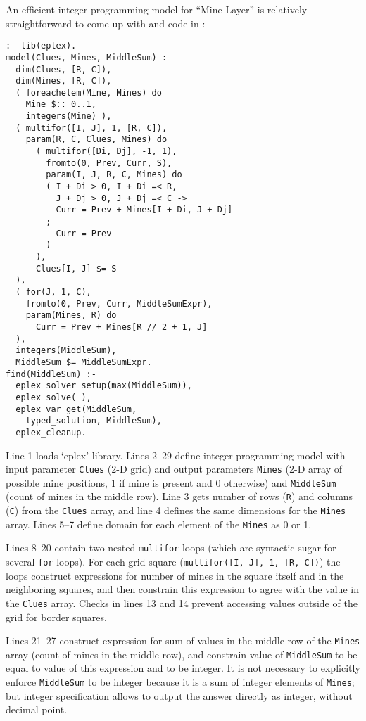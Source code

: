 \documentclass{acm_proc_article-sp}
\begin{document}
An efficient integer programming model for ``Mine Layer'' is relatively straightforward to come up with and code in \eclipse:

\begin{lstlisting}[caption={Integer programming solution for ``Mine Layer''}]
:- lib(eplex).
model(Clues, Mines, MiddleSum) :-
  dim(Clues, [R, C]),
  dim(Mines, [R, C]),
  ( foreachelem(Mine, Mines) do
    Mine $:: 0..1,
    integers(Mine) ),
  ( multifor([I, J], 1, [R, C]), 
    param(R, C, Clues, Mines) do
      ( multifor([Di, Dj], -1, 1), 
        fromto(0, Prev, Curr, S), 
        param(I, J, R, C, Mines) do
        ( I + Di > 0, I + Di =< R, 
          J + Dj > 0, J + Dj =< C ->
          Curr = Prev + Mines[I + Di, J + Dj]
        ;
          Curr = Prev
        )
      ),
      Clues[I, J] $= S 
  ),
  ( for(J, 1, C), 
    fromto(0, Prev, Curr, MiddleSumExpr), 
    param(Mines, R) do
      Curr = Prev + Mines[R // 2 + 1, J] 
  ),
  integers(MiddleSum),
  MiddleSum $= MiddleSumExpr.
find(MiddleSum) :-
  eplex_solver_setup(max(MiddleSum)),
  eplex_solve(_),
  eplex_var_get(MiddleSum, 
    typed_solution, MiddleSum),
  eplex_cleanup.
\end{lstlisting}

Line 1 loads `eplex' library. Lines 2--29 define integer programming model with input parameter \texttt{Clues} (2-D grid)
and output parameters \texttt{Mines} (2-D array of possible mine positions, 1 if mine is present and 0 otherwise) and \texttt{MiddleSum} (count of mines in the middle row).
Line 3 gets number of rows (\texttt{R}) and columns (\texttt{C}) from the \texttt{Clues} array, and line 4 defines the same dimensions for the \texttt{Mines} array.
Lines 5--7 define domain for each element of the \texttt{Mines} as 0 or 1.

Lines 8--20 contain two nested \texttt{multifor} loops (which are syntactic sugar for several \texttt{for} loops).
For each grid square (\texttt{multifor([I, J], 1, [R, C])}) the loops construct expressions for number of mines in the square itself and in the neighboring squares,
and then constrain this expression to agree with the value in the \texttt{Clues} array.
Checks in lines 13 and 14 prevent accessing values outside of the grid for border squares.

Lines 21--27 construct expression for sum of values in the middle row of the \texttt{Mines} array (count of mines in the middle row), 
and constrain value of \texttt{MiddleSum} to be equal to value of this expression and to be integer.
It is not necessary to explicitly enforce \texttt{MiddleSum} to be integer because it is a sum of integer elements of \texttt{Mines};
but integer specification allows to output the answer directly as integer, without decimal point.
\end{document}
